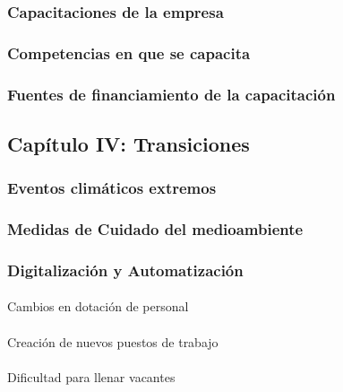 \documentclass[
  11pt,
]{article}
\makeatletter
\let\oldparagraph\paragraph
\renewcommand{\paragraph}{
    \@ifstar
      \xxxParagraphStar
      \xxxParagraphNoStar
  }
\newcommand{\xxxParagraphStar}[1]{\oldparagraph*{#1}\mbox{}}
\newcommand{\xxxParagraphNoStar}[1]{\oldparagraph{#1}\mbox{}}
\makeatother
\begin{document}
\subsubsection{Capacitaciones de la
empresa}\label{capacitaciones-de-la-empresa}

\subsubsection{Competencias en que se
capacita}\label{competencias-en-que-se-capacita}

\subsubsection{Fuentes de financiamiento de la
capacitación}\label{fuentes-de-financiamiento-de-la-capacitaciuxf3n}

\subsection{Capítulo IV:
Transiciones}\label{capuxedtulo-iv-transiciones}

\subsubsection{Eventos climáticos
extremos}\label{eventos-climuxe1ticos-extremos}

\subsubsection{Medidas de Cuidado del
medioambiente}\label{medidas-de-cuidado-del-medioambiente}

\subsubsection{Digitalización y
Automatización}\label{digitalizaciuxf3n-y-automatizaciuxf3n}

\paragraph{Cambios en dotación de
personal}\label{cambios-en-dotaciuxf3n-de-personal}

\paragraph{Creación de nuevos puestos de
trabajo}\label{creaciuxf3n-de-nuevos-puestos-de-trabajo}

\paragraph{Dificultad para llenar
vacantes}\label{dificultad-para-llenar-vacantes}
\end{document}
